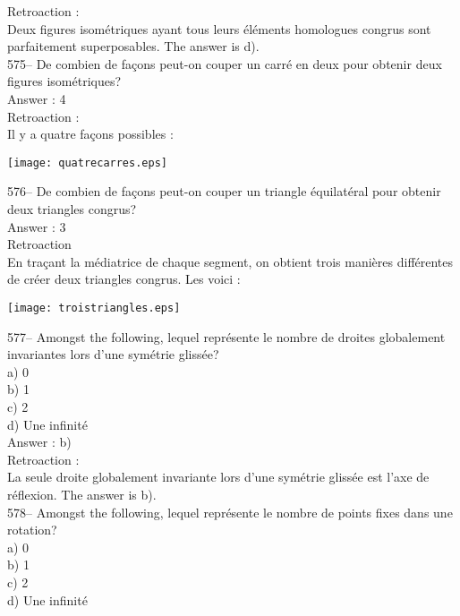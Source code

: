 ﻿\documentclass[letterpaper, 12pt]{article}
\begin{document}
Retroaction : \\
Deux figures isom\'etriques ayant tous leurs \'el\'ements homologues congrus
sont parfaitement superposables.  The answer is d).\\

575-- De combien de fa\c cons peut-on couper un carr\'e en deux pour obtenir
deux figures isom\'etriques?\\

Answer : 4\\

Retroaction : \\
Il y a quatre fa\c cons possibles :   \\
    \begin{center}
    \texttt{[image: quatrecarres.eps]}
    \end{center}


576-- De combien de fa\c cons peut-on couper un triangle \'equilat\'eral
pour obtenir deux triangles congrus?\\

Answer : 3\\

Retroaction\\
En tra\c cant la m\'ediatrice de chaque segment, on obtient trois mani\`eres
diff\'erentes de cr\'eer deux triangles congrus.  Les voici :\\
    \begin{center}
    \texttt{[image: troistriangles.eps]}
    \end{center}


577-- Amongst the following, lequel repr\'esente le nombre de
droites globalement invariantes lors d'une sym\'etrie gliss\'ee?\\
a) 0\\
b) 1\\
c) 2\\
d) Une infinit\'e\\

Answer : b)\\

Retroaction : \\
La seule droite globalement invariante lors d'une sym\'etrie gliss\'ee est
l'axe de r\'eflexion.  The answer is b).\\

578-- Amongst the following, lequel repr\'esente le nombre de
points fixes dans une rotation?\\
a) 0\\
b) 1\\
c) 2\\
d) Une infinit\'e\\
\end{document}

